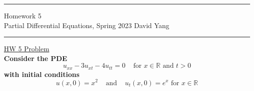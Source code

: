 \documentclass[11pt]{article}
\begin{document}
	\hrule
	\begin{center}
		{\Large Homework 5} \\ %
		\vspace{0.2cm}
		Partial Differential Equations, Spring 2023 \hfill David Yang %
	\end{center}

\hrule

\vspace{1em}

\underline{HW 5 Problem} \\

\textbf{Consider the PDE \[u_{xx} - 3u_{xt} - 4u_{tt} = 0 \, \, \, \, \, \text{ for } x \in \mathbb{R} \text { and } t > 0\] with initial conditions 
\[u(x, 0) = x^2 \, \, \, \, \, \text{ and } \, \, \, \, \, u_t(x, 0) = e^x \text{ for } x \in \mathbb{R}\]}
\end{document}
